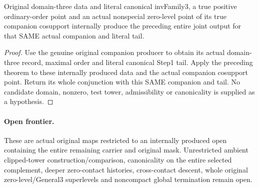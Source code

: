 \begin{theorem}
\label{hir:zero-contact-general-three-remainder-test-tower}
\leanok
{}
Original domain-three data and literal canonical invFamily3, a true positive
ordinary-order point and an actual nonspecial zero-level point of its true
companion cosupport internally produce the preceding entire joint output
for that SAME actual companion and literal tail.
\end{theorem}
\begin{proof}
Use the genuine original companion producer to obtain its actual domain-three
record, maximal order and literal canonical Step1 tail. Apply the preceding
theorem to these internally produced data and the actual companion cosupport
point. Return its whole conjunction with this SAME companion and tail. No
candidate domain, nonzero, test tower, admissibility or canonicality is supplied
as a hypothesis.
\end{proof}

\paragraph{Open frontier.}
These are actual original maps restricted to an internally produced open
containing the entire remaining carrier and original mask. Unrestricted
ambient clipped-tower construction/comparison, canonicality on the entire
selected complement, deeper zero-contact histories, cross-contact descent,
whole original zero-level/General3 superlevels and noncompact global
termination remain open.
